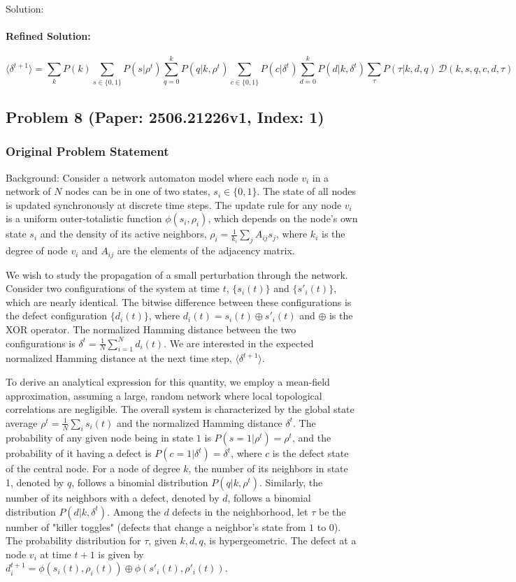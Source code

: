\documentclass[10pt]{article}
\begin{document}
Solution:

\paragraph*{Refined Solution:}
\[ \langle\delta^{t+1}\rangle = \sum_k P(k) \sum_{s \in \{0,1\}} P(s|\rho^t) \sum_{q=0}^k P(q|k,\rho^t) \sum_{c \in \{0,1\}}P(c|\delta^t) \sum_{d=0}^k P(d|k, \delta^t) \sum_{\tau} P(\tau|k,d,q) \, \mathcal{D}(k, s, q, c, d, \tau) \]

\newpage
\subsection*{Problem 8 (Paper: 2506.21226v1, Index: 1)}

\subsubsection*{Original Problem Statement}
Background:
Consider a network automaton model where each node $v_i$ in a network of $N$ nodes can be in one of two states, $s_i \in \{0,1\}$. The state of all nodes is updated synchronously at discrete time steps. The update rule for any node $v_i$ is a uniform outer-totalistic function $\phi(s_i, \rho_i)$, which depends on the node's own state $s_i$ and the density of its active neighbors, $\rho_i = \frac{1}{k_i}\sum_{j}A_{ij}s_j$, where $k_i$ is the degree of node $v_i$ and $A_{ij}$ are the elements of the adjacency matrix.

We wish to study the propagation of a small perturbation through the network. Consider two configurations of the system at time $t$, $\{s_i(t)\}$ and $\{s'_i(t)\}$, which are nearly identical. The bitwise difference between these configurations is the defect configuration $\{d_i(t)\}$, where $d_i(t) = s_i(t) \oplus s'_i(t)$ and $\oplus$ is the XOR operator. The normalized Hamming distance between the two configurations is $\delta^t = \frac{1}{N}\sum_{i=1}^N d_i(t)$. We are interested in the expected normalized Hamming distance at the next time step, $\langle\delta^{t+1}\rangle$.

To derive an analytical expression for this quantity, we employ a mean-field approximation, assuming a large, random network where local topological correlations are negligible. The overall system is characterized by the global state average $\rho^t = \frac{1}{N}\sum_i s_i(t)$ and the normalized Hamming distance $\delta^t$. The probability of any given node being in state $1$ is $P(s=1|\rho^t) = \rho^t$, and the probability of it having a defect is $P(c=1|\delta^t) = \delta^t$, where $c$ is the defect state of the central node. For a node of degree $k$, the number of its neighbors in state 1, denoted by $q$, follows a binomial distribution $P(q|k, \rho^t)$. Similarly, the number of its neighbors with a defect, denoted by $d$, follows a binomial distribution $P(d|k, \delta^t)$. Among the $d$ defects in the neighborhood, let $\tau$ be the number of "killer toggles" (defects that change a neighbor's state from $1$ to $0$). The probability distribution for $\tau$, given $k, d, q$, is hypergeometric. The defect at a node $v_i$ at time $t+1$ is given by $d_i^{t+1} = \phi(s_i(t), \rho_i(t)) \oplus \phi(s'_i(t), \rho'_i(t))$.
\end{document}
